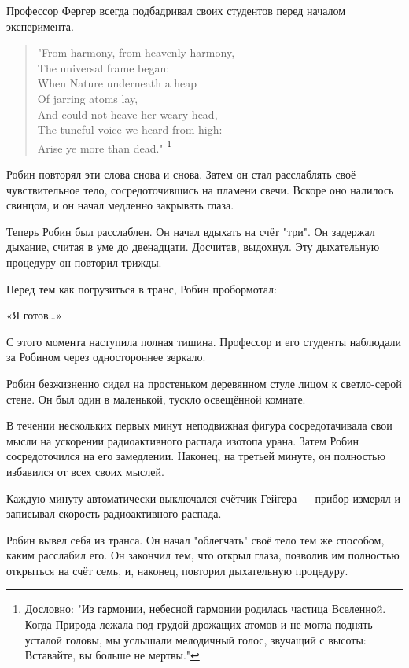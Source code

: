 \documentclass[a5paper, 9pt,
final, openany, twoside=true]{memoir}
\begin{document}
Профессор Фергер всегда подбадривал своих студентов перед началом эксперимента.
\begin{quote}
"From harmony, from heavenly harmony,\\
The universal frame began:\\
When Nature underneath a heap\\
Of jarring atoms lay,\\
And could not heave her weary head,\\
The tuneful voice we heard from high:\\
Arise ye more than dead." \footnote[1]{Дословно: "Из гармонии, небесной гармонии родилась частица Вселенной. Когда Природа лежала под грудой дрожащих атомов и не могла поднять усталой головы, мы услышали мелодичный голос, звучащий с высоты: Вставайте, вы больше не мертвы."}
\end{quote}

Робин повторял эти слова снова и снова. Затем он стал расслаблять своё чувствительное тело, сосредоточившись на пламени свечи. Вскоре оно налилось свинцом, и он начал медленно закрывать глаза.

Теперь Робин был расслаблен.  Он начал вдыхать на счёт "три". Он задержал дыхание, считая в уме до двенадцати. Досчитав, выдохнул. Эту дыхательную процедуру он повторил трижды.

Перед тем как погрузиться в транс, Робин пробормотал:

«Я готов…»\bigskip

С этого момента наступила полная тишина. Профессор и его студенты наблюдали за Робином через одностороннее зеркало.\bigskip

Робин безжизненно сидел на простеньком деревянном стуле лицом к светло-серой стене. Он был один в маленькой, тускло освещённой комнате.

В течении нескольких первых минут неподвижная фигура сосредотачивала свои мысли на ускорении радиоактивного распада изотопа урана. Затем Робин сосредоточился на его замедлении. Наконец, на третьей минуте, он полностью избавился от всех своих мыслей.

Каждую минуту автоматически выключался счётчик Гейгера — прибор измерял и записывал скорость радиоактивного распада.\bigskip

Робин вывел себя из транса. Он начал "облегчать" своё тело тем же способом, каким расслабил его. Он закончил тем, что открыл глаза, позволив им полностью открыться на счёт семь, и, наконец, повторил дыхательную процедуру.
\end{document}
